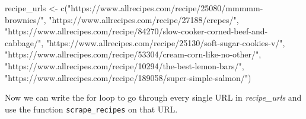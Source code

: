 \documentclass[
]{krantz}
\makeatletter
\newenvironment{Shaded}{\begin{snugshade}}{\end{snugshade}}
\newcommand{\FunctionTok}[1]{\textcolor[rgb]{0,0,0}{#1}}
\newcommand{\NormalTok}[1]{#1}
\newcommand{\OtherTok}[1]{\textcolor[rgb]{0.37,0.37,0.37}{#1}}
\newcommand{\StringTok}[1]{\textcolor[rgb]{0.5,0.5,0.5}{#1}}
\newenvironment{kframe}{%
\medskip{}
\setlength{\fboxsep}{.8em}
 \def\at@end@of@kframe{}%
 \ifinner\ifhmode%
  \def\at@end@of@kframe{\end{minipage}}%
  \begin{minipage}{\columnwidth}%
 \fi\fi%
 \def\FrameCommand##1{\hskip\@totalleftmargin \hskip-\fboxsep
 \colorbox{shadecolor}{##1}\hskip-\fboxsep
     \hskip-\linewidth \hskip-\@totalleftmargin \hskip\columnwidth}%
 \MakeFramed {\advance\hsize-\width
   \@totalleftmargin\z@ \linewidth\hsize
   \@setminipage}}%
 {\par\unskip\endMakeFramed%
 \at@end@of@kframe}
\renewenvironment{Shaded}{\begin{kframe}}{\end{kframe}}
\makeatother
\begin{document}
\begin{Shaded}
\begin{Highlighting}[]
\NormalTok{recipe\_urls }\OtherTok{\textless{}{-}} \FunctionTok{c}\NormalTok{(}\StringTok{"https://www.allrecipes.com/recipe/25080/mmmmm{-}brownies/"}\NormalTok{,}
                 \StringTok{"https://www.allrecipes.com/recipe/27188/crepes/"}\NormalTok{,}
                 \StringTok{"https://www.allrecipes.com/recipe/84270/slow{-}cooker{-}corned{-}beef{-}and{-}cabbage/"}\NormalTok{,}
                 \StringTok{"https://www.allrecipes.com/recipe/25130/soft{-}sugar{-}cookies{-}v/"}\NormalTok{,}
                 \StringTok{"https://www.allrecipes.com/recipe/53304/cream{-}corn{-}like{-}no{-}other/"}\NormalTok{,}
                 \StringTok{"https://www.allrecipes.com/recipe/10294/the{-}best{-}lemon{-}bars/"}\NormalTok{,}
                 \StringTok{"https://www.allrecipes.com/recipe/189058/super{-}simple{-}salmon/"}\NormalTok{)}
\end{Highlighting}
\end{Shaded}

Now we can write the for loop to go through every single URL in \emph{recipe\_urls} and use the function \texttt{scrape\_recipes} on that URL.
\end{document}
